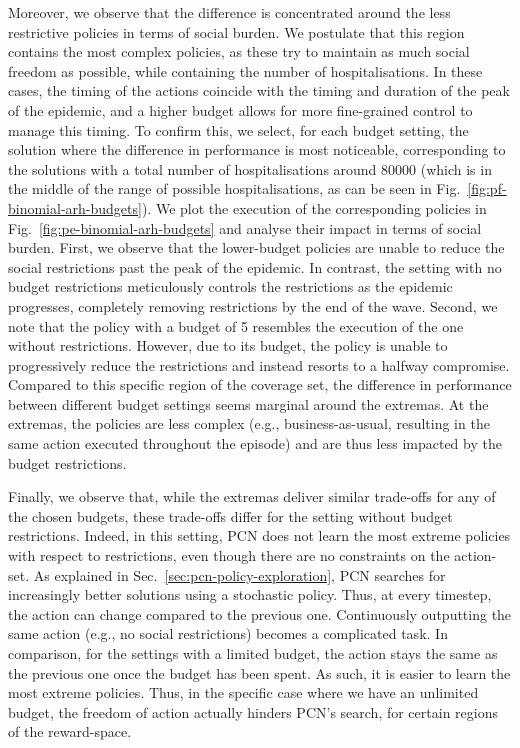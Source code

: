 \documentclass{article}
\begin{document}
Moreover, we observe that the difference is concentrated around the less restrictive policies in terms of social burden. We postulate that this region contains the most complex policies, as these try to maintain as much social freedom as possible, while containing the number of hospitalisations. In these cases, the timing of the actions coincide with the timing and duration of the peak of the epidemic, and a higher budget allows for more fine-grained control to manage this timing. To confirm this, we select, for each budget setting, the solution where the difference in performance is most noticeable, corresponding to the solutions with a total number of hospitalisations around $80000$ (which is in the middle of the range of possible hospitalisations, as can be seen in Fig.~\ref{fig:pf-binomial-arh-budgets}). We plot the execution of the corresponding policies in Fig.~\ref{fig:pe-binomial-arh-budgets} and analyse their impact in terms of social burden. First, we observe that the lower-budget policies are unable to reduce the social restrictions past the peak of the epidemic. In contrast, the setting with no budget restrictions meticulously controls the restrictions as the epidemic progresses, completely removing restrictions by the end of the wave. Second, we note that the policy with a budget of 5 resembles the execution of the one without restrictions. However, due to its budget, the policy is unable to progressively reduce the restrictions and instead resorts to a halfway compromise. Compared to this specific region of the coverage set, the difference in performance between different budget settings seems marginal around the extremas. At the extremas, the policies are less complex (e.g., business-as-usual, resulting in the same action executed throughout the episode) and are thus less impacted by the budget restrictions.

Finally, we observe that, while the extremas deliver similar trade-offs for any of the chosen budgets, these trade-offs differ for the setting without budget restrictions. Indeed, in this setting, PCN does not learn the most extreme policies with respect to restrictions, even though there are no constraints on the action-set. As explained in Sec.~\ref{sec:pcn-policy-exploration}, PCN searches for increasingly better solutions using a stochastic policy. Thus, at every timestep, the action can change compared to the previous one. Continuously outputting the same action (e.g., no social restrictions) becomes a complicated task. In comparison, for the settings with a limited budget, the action stays the same as the previous one once the budget has been spent. As such, it is easier to learn the most extreme policies. Thus, in the specific case where we have an unlimited budget, the freedom of action actually hinders PCN's search, for certain regions of the reward-space.
\end{document}
